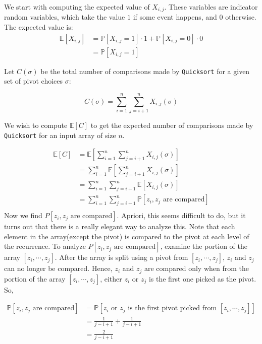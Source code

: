 \documentclass [12pt]{article}
\begin{document}
We start with computing the expected value of $X_{i ,j}$. These variables are indicator random variables, which take the value $1$ if some event happens, and $0$ otherwise. The expected value is:
\begin{align*}
\mathbb{E}[X_{i,j}] &= \mathbb{P}[X_{i,j} = 1] \cdot 1 + \mathbb{P}[X_{i,j} = 0] \cdot 0 \tag{definition of expectation} \\
&= \mathbb{P}[X_{i,j} = 1]
\end{align*}

Let $C(\sigma)$ be the total number of comparisons made by \texttt{Quicksort} for a given set of pivot choices $\sigma$:

$$
C(\sigma) = \sum_{i=1}^n \sum_{j=i+1}^n X_{i,j}(\sigma) 
$$

We wish to compute $\mathbb{E}[C]$ to get the expected number of comparisons made by \texttt{Quicksort}
for an input array of size $n$.

\begin{align*}
  \mathbb{E}[C] &= \mathbb{E}\left[\sum_{i=1}^n \sum_{j=i+1}^n X_{i,j}(\sigma) \right] \tag{definition of $C$} \\
  &= \sum_{i=1}^n \mathbb{E}\left[\sum_{j=i+1}^n X_{i,j}(\sigma) \right] \tag{linearity of expectation on first sum} \\
  &= \sum_{i=1}^n \sum_{j=i+1}^n  \mathbb{E}[X_{i,j}(\sigma)] \tag{linearity of expectation on second sum} \\
  &= \sum_{i=1}^n \sum_{j=i+1}^n  \mathbb{P}[z_i, z_j \text{ are compared} ]  \tag{definition of expectation on indicator variable}\\
\end{align*}
Now we find $P[z_i, z_j \text{ are compared}]$. Apriori, this seems difficult to do, but it turns out that there is a really elegant way to analyze this. Note that each element in the array(except the pivot) is compared to the pivot at each level of the recurrence. To analyze $P[z_i, z_j \text{ are compared}]$, examine the portion of the array $[z_i, \cdots, z_j]$. After the array is split using a pivot from $[z_i, \cdots, z_j]$, $z_i$ and $z_j$ can no longer be compared. Hence, $z_i$ and $z_j$ are compared only when from the portion of the array $[z_i, \cdots, z_j]$, either $z_i$ or $z_j$ is the first one picked as the pivot. So,

\begin{align*}
\mathbb{P}[z_i, z_j \text{ are compared}] &= \mathbb{P}[z_i \text{ or } z_j \text{ is the first pivot picked from } [z_i, \cdots, z_j]] \tag{argued above} \\
&= \frac{1}{j-i+1} + \frac{1}{j - i + 1} \tag{picking from a set uniformly} \\
&= \frac{2}{j-i+1}
\end{align*}
\end{document}
